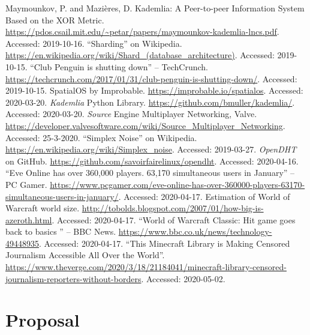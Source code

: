 \documentclass[12pt,notitlepage,a4paper]{report}
\begin{document}
	\begin{thebibliography}{9}
		 Maymounkov, P. and Mazières, D. Kademlia: A Peer-to-peer Information System Based on the XOR Metric. \url{https://pdos.csail.mit.edu/~petar/papers/maymounkov-kademlia-lncs.pdf}. Accessed: 2019-10-16.
		 ``Sharding'' on Wikipedia. \url{https://en.wikipedia.org/wiki/Shard_(database_architecture)}. Accessed: 2019-10-15.
		 ``Club Penguin is shutting down'' -- TechCrunch. \url{https://techcrunch.com/2017/01/31/club-penguin-is-shutting-down/}. Accessed: 2019-10-15.
		 SpatialOS by Improbable. \url{https://improbable.io/spatialos}. Accessed: 2020-03-20.
		 \emph{Kademlia} Python Library. \url{https://github.com/bmuller/kademlia/}. Accessed: 2020-03-20.
		 \emph{Source} Engine Multiplayer Networking, Valve. \url{https://developer.valvesoftware.com/wiki/Source_Multiplayer_Networking}. Accessed: 25-3-2020.
		 ``Simplex Noise'' on Wikipedia.
		\url{https://en.wikipedia.org/wiki/Simplex_noise}. Accessed: 2019-03-27.
		 \emph{OpenDHT} on GitHub. \url{https://github.com/savoirfairelinux/opendht}. Accessed: 2020-04-16.
		 ``Eve Online has over 360,000 players. 63,170 simultaneous users in January'' -- PC Gamer. \url{https://www.pcgamer.com/eve-online-has-over-360000-players-63170-simultaneous-users-in-january/}. Accessed: 2020-04-17.
		 Estimation of World of Warcraft world size. \url{http://tobolds.blogspot.com/2007/01/how-big-is-azeroth.html}. Accessed: 2020-04-17.
		 ``World of Warcraft Classic: Hit game goes back to basics
		'' -- BBC News. \url{https://www.bbc.co.uk/news/technology-49448935}. Accessed: 2020-04-17.
		 ``This Minecraft Library is Making Censored Journalism Accessible All Over the World''. \url{https://www.theverge.com/2020/3/18/21184041/minecraft-library-censored-journalism-reporters-without-borders}. Accessed: 2020-05-02.
	\end{thebibliography}
	\clearpage
	
	\appendix
	\chapter{Proposal}
	
\end{document}
